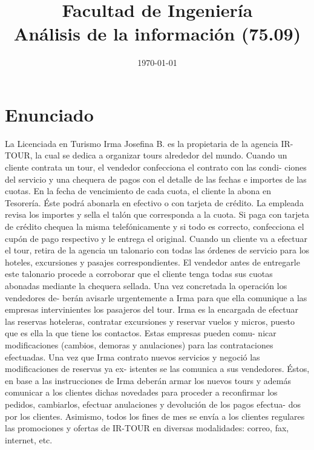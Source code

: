 \documentclass[12pt,a4paper,titlepage,oneside]{article}
\title{Facultad de Ingeniería\\Análisis de la información (75.09)}
\date{\today}
\begin{document}
    \fancyhead[LE]{\leftmark} 
    \fancyhead[RO]{\rightmark} 
    \renewcommand{\headrulewidth}{0.4pt} 
    \renewcommand{\footrulewidth}{0pt}

    \pagestyle{fancy}


 \maketitle
  \setcounter{page}{1}
  \tableofcontents

\newpage{}
\setcounter{page}{1}

\section{Enunciado}

La Licenciada en Turismo Irma Josefina B. es la propietaria de la agencia IR-TOUR, la cual
se dedica a organizar tours alrededor del mundo.
Cuando un cliente contrata un tour, el vendedor confecciona el contrato con las condi-
ciones del servicio y una chequera de pagos con el detalle de las fechas e importes de las
cuotas.
En la fecha de vencimiento de cada cuota, el cliente la abona en Tesorería. Éste podrá
abonarla en efectivo o con tarjeta de crédito. La empleada revisa los importes y sella el talón
que corresponda a la cuota. Si paga con tarjeta de crédito chequea la misma telefónicamente
y si todo es correcto, confecciona el cupón de pago respectivo y le entrega el original.
Cuando un cliente va a efectuar el tour, retira de la agencia un talonario con todas las
órdenes de servicio para los hoteles, excursiones y pasajes correspondientes. El vendedor
antes de entregarle este talonario procede a corroborar que el cliente tenga todas sus cuotas
abonadas mediante la chequera sellada. Una vez concretada la operación los vendedores de-
berán avisarle urgentemente a Irma para que ella comunique a las empresas intervinientes
los pasajeros del tour.
Irma es la encargada de efectuar las reservas hoteleras, contratar excursiones y reservar
vuelos y micros, puesto que es ella la que tiene los contactos. Estas empresas pueden comu-
nicar modificaciones (cambios, demoras y anulaciones) para las contrataciones efectuadas.
Una vez que Irma contrato nuevos servicios y negoció las modificaciones de reservas ya ex-
istentes se las comunica a sus vendedores. Éstos, en base a las instrucciones de Irma deberán
armar los nuevos tours y además comunicar a los clientes dichas novedades para proceder a
reconfirmar los pedidos, cambiarlos, efectuar anulaciones y devolución de los pagos efectua-
dos por los clientes.
Asimismo, todos los fines de mes se envía a los clientes regulares las promociones y ofertas
de IR-TOUR en diversas modalidades: correo, fax, internet, etc.
\end{document}

